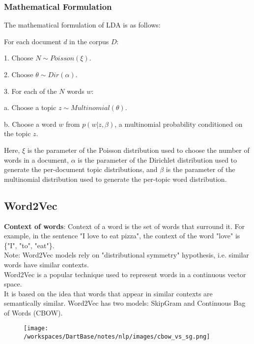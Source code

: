 \documentclass[12pt]{article}
\newcommand{\bold}[1]{\textbf{#1}}
\begin{document}
        \subsubsection{Mathematical Formulation}

            The mathematical formulation of LDA is as follows:
            
            For each document $d$ in the corpus $D$:
            
            1. Choose $N \sim Poisson(\xi)$.
            
            2. Choose $\theta \sim Dir(\alpha)$.
            
            3. For each of the $N$ words $w$:
            
                a. Choose a topic $z \sim Multinomial(\theta)$.
            
                b. Choose a word $w$ from $p(w|z,\beta)$, a multinomial probability conditioned on the topic $z$.
            
            Here, $\xi$ is the parameter of the Poisson distribution used to choose the number of words in a document, $\alpha$ is the parameter of the Dirichlet distribution used to generate the per-document topic distributions, and $\beta$ is the parameter of the multinomial distribution used to generate the per-topic word distribution.
        

    \subsection{Word2Vec}
        \bold{Context of words}: Context of a word is the set of words that surround it.
        For example, in the sentence "I love to eat pizza", the context of the word "love" is \{"I", "to", "eat"\}.
        \\
        Note: Word2Vec models rely on "distributional symmetry" hypothesis, i.e. similar words have similar contexts.
        \\
        Word2Vec is a popular technique used to represent words in a continuous vector space. \\
        It is based on the idea that words that appear in similar contexts are semantically similar.
        Word2Vec has two models: SkipGram and Continuous Bag of Words (CBOW).
        \begin{figure}[h]
            \centering
            \texttt{[image: /workspaces/DartBase/notes/nlp/images/cbow\_vs\_sg.png]}
        \end{figure}
\end{document}
